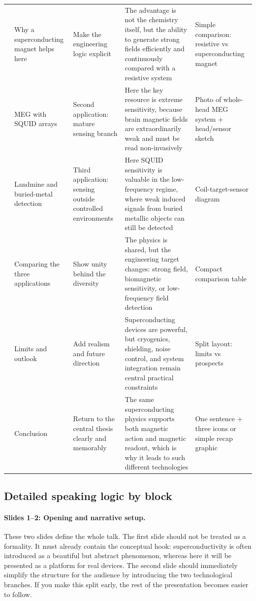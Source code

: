 \documentclass[11pt,a4paper]{article}
\begin{document}
\begin{center}
\begin{tabular}{>{\raggedright\arraybackslash}p{0.9cm}>{\raggedright\arraybackslash}p{3.2cm}>{\raggedright\arraybackslash}p{3.8cm}>{\raggedright\arraybackslash}p{3.7cm}>{\raggedright\arraybackslash}p{2.6cm}}
7 & Why a superconducting magnet helps here & Make the engineering logic explicit & The advantage is not the chemistry itself, but the ability to generate strong fields efficiently and continuously compared with a resistive system & Simple comparison: resistive vs superconducting magnet \\
8 & MEG with SQUID arrays & Second application: mature sensing branch & Here the key resource is extreme sensitivity, because brain magnetic fields are extraordinarily weak and must be read non-invasively & Photo of whole-head MEG system + head/sensor sketch \\
9 & Landmine and buried-metal detection & Third application: sensing outside controlled environments & Here SQUID sensitivity is valuable in the low-frequency regime, where weak induced signals from buried metallic objects can still be detected & Coil-target-sensor diagram \\
10 & Comparing the three applications & Show unity behind the diversity & The physics is shared, but the engineering target changes: strong field, biomagnetic sensitivity, or low-frequency field detection & Compact comparison table \\
11 & Limits and outlook & Add realism and future direction & Superconducting devices are powerful, but cryogenics, shielding, noise control, and system integration remain central practical constraints & Split layout: limits vs prospects \\
12 & Conclusion & Return to the central thesis clearly and memorably & The same superconducting physics supports both magnetic action and magnetic readout, which is why it leads to such different technologies & One sentence + three icons or simple recap graphic \\
\bottomrule
\end{tabular}
\end{center}

\subsection{Detailed speaking logic by block}

\paragraph{Slides 1--2: Opening and narrative setup.}
These two slides define the whole talk. The first slide should not be treated as a formality. It must already contain the conceptual hook: superconductivity is often introduced as a beautiful but abstract phenomenon, whereas here it will be presented as a platform for real devices. The second slide should immediately simplify the structure for the audience by introducing the two technological branches. If you make this split early, the rest of the presentation becomes easier to follow.
\end{document}

